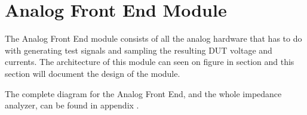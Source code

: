 \chapter{Analog Front End Module} \label{sec:AnalogFrontEndModule}
The Analog Front End module consists of all the analog hardware that has to do with generating test signals and sampling the resulting DUT voltage and currents. The architecture of this module can seen on figure  in section  and this section will document the design of the module.

The complete diagram for the Analog Front End, and the whole impedance analyzer, can be found in appendix . %
